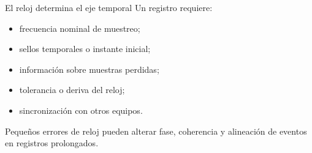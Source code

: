 \documentclass[
  ignorenonframetext,
  aspectratio=169,
  spanish,
]{beamer}
\providecommand{\tightlist}{%
  \setlength{\itemsep}{0pt}\setlength{\parskip}{0pt}}
\begin{document}
\begin{frame}{El reloj determina el eje temporal}
  \protect{}\label{el-reloj-determina-el-eje-temporal}
  Un registro requiere:

  \begin{itemize}
    \tightlist
    \item
          frecuencia nominal de muestreo;
    \item
          sellos temporales o instante inicial;
    \item
          información sobre muestras perdidas;
    \item
          tolerancia o deriva del reloj;
    \item
          sincronización con otros equipos.
  \end{itemize}

  \begin{tcolorbox}[enhanced jigsaw, arc=.35mm, bottomrule=.15mm, bottomtitle=1mm, breakable, colback=white, colbacktitle=quarto-callout-note-color!10!white, colframe=quarto-callout-note-color-frame, coltitle=black, left=2mm, leftrule=.75mm, opacityback=0, opacitybacktitle=0.6, rightrule=.15mm, title=\textcolor{quarto-callout-note-color}{\faInfo}\hspace{0.5em}{Nota}, titlerule=0mm, toprule=.15mm, toptitle=1mm]

    Pequeños errores de reloj pueden alterar fase, coherencia y alineación
    de eventos en registros prolongados.

  \end{tcolorbox}
\end{frame}
\end{document}

